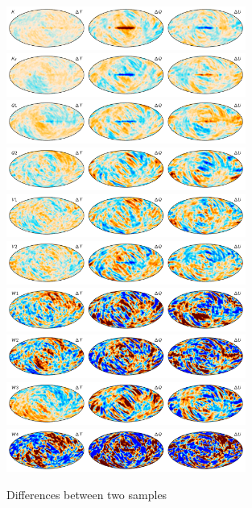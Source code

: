 \documentclass[twocolumn]{../../common/aa}
\begin{document}
\begin{figure}
	\centering
	\includegraphics[width=0.7\textwidth]{figures/023-WMAP_K_sampdiff.pdf}
	\includegraphics[width=0.7\textwidth]{figures/030-WMAP_Ka_sampdiff.pdf}
	\includegraphics[width=0.7\textwidth]{figures/040-WMAP_Q1_sampdiff.pdf}
	\includegraphics[width=0.7\textwidth]{figures/040-WMAP_Q2_sampdiff.pdf}
	\includegraphics[width=0.7\textwidth]{figures/060-WMAP_V1_sampdiff.pdf}
	\includegraphics[width=0.7\textwidth]{figures/060-WMAP_V2_sampdiff.pdf}
	\includegraphics[width=0.7\textwidth]{figures/090-WMAP_W1_sampdiff.pdf}
	\includegraphics[width=0.7\textwidth]{figures/090-WMAP_W2_sampdiff.pdf}
	\includegraphics[width=0.7\textwidth]{figures/090-WMAP_W3_sampdiff.pdf}
	\includegraphics[width=0.7\textwidth]{figures/090-WMAP_W4_sampdiff.pdf}
	\caption{Differences between two samples}
        \label{fig:sampdiff}
\end{figure}
\end{document}
